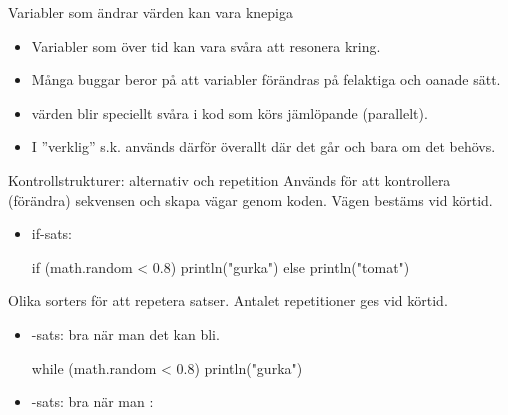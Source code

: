 \begin{Slide}{Variabler som ändrar värden kan vara knepiga}
\begin{itemize}
\item Variabler som  över tid kan vara svåra att resonera kring.

\item Många buggar beror på att variabler förändras på felaktiga och oanade sätt.

\item {} värden blir speciellt svåra i kod som körs jämlöpande (parallelt).

\item I ''verklig'' s.k.  används därför  överallt där det går och  bara om det  behövs.
\end{itemize}
\end{Slide}



\begin{Slide}{Kontrollstrukturer: alternativ och repetition}\SlideFontSmall
Används för att kontrollera (förändra) sekvensen och skapa  vägar genom koden. Vägen  bestäms vid körtid.
\begin{itemize}
\item if-sats:
\begin{Code}
if (math.random < 0.8) println("gurka") else println("tomat")
\end{Code}
\end{itemize}

Olika sorters  för att repetera satser. Antalet repetitioner ges vid körtid.
\begin{itemize}
\item {}-sats: bra när man  det kan bli.
\begin{Code}
while (math.random < 0.8) println("gurka")
\end{Code}

\item {}-sats: bra när man :

\end{itemize}
\end{Slide}

